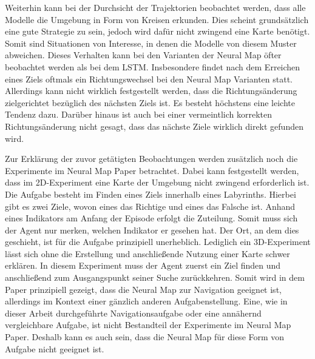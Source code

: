 Weiterhin kann bei der Durchsicht der Trajektorien beobachtet werden, dass alle Modelle die Umgebung in Form von Kreisen erkunden. Dies scheint grundsätzlich eine gute Strategie zu sein, jedoch wird dafür nicht zwingend eine Karte benötigt. Somit sind Situationen von Interesse, in denen die Modelle von diesem Muster abweichen. Dieses Verhalten kann bei den Varianten der Neural Map öfter beobachtet werden als bei dem LSTM. Insbesondere findet nach dem Erreichen eines Ziels oftmals ein Richtungswechsel bei den Neural Map Varianten statt. Allerdings kann nicht wirklich festgestellt werden, dass die Richtungsänderung zielgerichtet bezüglich des nächsten Ziels ist. Es besteht höchstens eine leichte Tendenz dazu. Darüber hinaus ist auch bei einer vermeintlich korrekten Richtungsänderung nicht gesagt, dass das nächste Ziele wirklich direkt gefunden wird.

Zur Erklärung der zuvor getätigten Beobachtungen werden zusätzlich noch die Experimente im Neural Map Paper betrachtet. Dabei kann festgestellt werden, dass im 2D-Experiment eine Karte der Umgebung nicht zwingend erforderlich ist. Die Aufgabe besteht im Finden eines Ziels innerhalb eines Labyrinths. Hierbei gibt es zwei Ziele, wovon eines das Richtige und eines das Falsche ist. Anhand eines Indikators am Anfang der Episode erfolgt die Zuteilung. Somit muss sich der Agent nur merken, welchen Indikator er gesehen hat. Der Ort, an dem dies geschieht, ist für die Aufgabe prinzipiell unerheblich. Lediglich ein 3D-Experiment lässt sich ohne die Erstellung und anschließende Nutzung einer Karte schwer erklären. In diesem Experiment muss der Agent zuerst ein Ziel finden und anschließend zum Ausgangspunkt seiner Suche zurückkehren. Somit wird in dem Paper prinzipiell gezeigt, dass die Neural Map zur Navigation geeignet ist, allerdings im Kontext einer gänzlich anderen Aufgabenstellung. Eine, wie in dieser Arbeit durchgeführte Navigationsaufgabe oder eine annähernd vergleichbare Aufgabe, ist nicht Bestandteil der Experimente im Neural Map Paper. Deshalb kann es auch sein, dass die Neural Map für diese Form von Aufgabe nicht geeignet ist.


